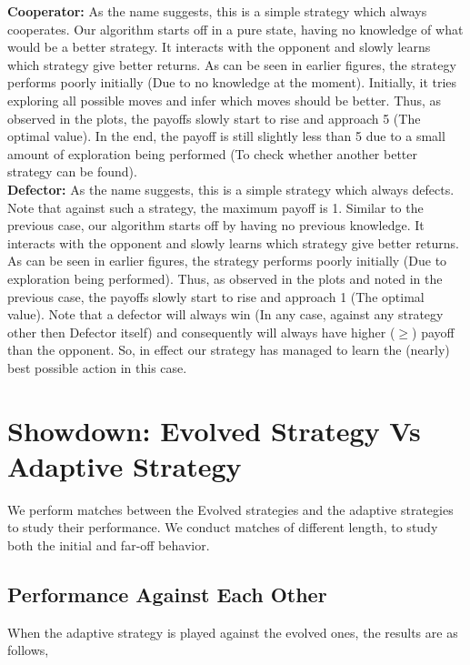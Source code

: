 \documentclass[a4paper]{article}
\begin{document}
	\noindent
	\textbf{Cooperator: } As the name suggests, this is a simple strategy which always cooperates. Our algorithm starts off in a pure state, having no knowledge of what would be a better strategy. It interacts with the opponent and slowly learns which strategy give better returns. As can be seen in earlier figures, the strategy performs poorly initially (Due to no knowledge at the moment). Initially, it tries exploring all possible moves and infer which moves should be better. Thus, as observed in the plots, the payoffs slowly start to rise and approach 5 (The optimal value). In the end, the payoff is still slightly less than 5 due to a small amount of exploration being performed (To check whether another better strategy can be found).\\
	
	\noindent
	\textbf{Defector: } As the name suggests, this is a simple strategy which always defects. Note that against such a strategy, the maximum payoff is 1. 	Similar to the previous case, our algorithm starts off by having no previous knowledge. It interacts with the opponent and slowly learns which strategy give better returns. As can be seen in earlier figures, the strategy performs poorly initially (Due to exploration being performed). Thus, as observed in the plots and noted in the previous case, the payoffs slowly start to rise and approach 1 (The optimal value). Note that a defector will always win (In any case, against any strategy other then Defector itself) and consequently will always have higher ($\geq$) payoff than the opponent. So, in effect our strategy has managed to learn the (nearly) best possible action in this case.

	\section{Showdown: Evolved Strategy Vs Adaptive Strategy}

	We perform matches between the Evolved strategies and the adaptive strategies to study their performance. We conduct matches of different length, to study both the initial and far-off behavior.
	
	\subsection{Performance Against Each Other}

	When the adaptive strategy is played against the evolved ones, the results are as follows,
	
\end{document}
